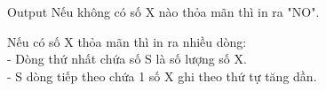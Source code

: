 Output
Nếu không có số X nào thỏa mãn thì in ra "NO".

Nếu có số X thỏa mãn thì in ra nhiều dòng:
\\- Dòng thứ nhất chứa số S là số lượng số X.
\\- S dòng tiếp theo chứa 1 số X ghi theo thứ tự tăng dần.
